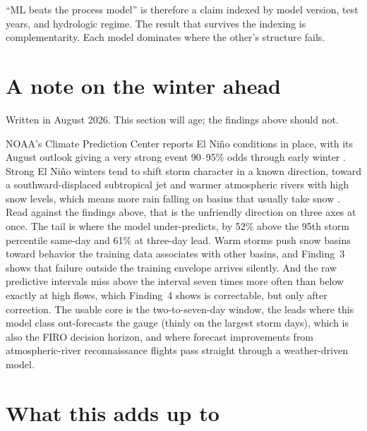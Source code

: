 \documentclass[11pt]{article}
\newcommand{\finding}[1]{\section*{#1}}
\begin{document}
``ML beats the process model'' is therefore a claim indexed by model version, test years,
and hydrologic regime. The result that survives the indexing is complementarity. Each
model dominates where the other's structure fails.

\finding{A note on the winter ahead}

Written in August 2026. This section will age; the findings above should not.

NOAA's Climate Prediction Center reports El Ni\~no conditions in place, with its August
outlook giving a very strong event 90--95\% odds through early winter
\citep{cpc2026enso}. Strong El Ni\~no winters tend to shift storm character in a known
direction, toward a southward-displaced subtropical jet and warmer atmospheric rivers with
high snow levels, which means more rain falling on basins that usually take snow
\citep{gershunov2025atmospheric}. Read against the findings above, that is the unfriendly
direction on three axes at once. The tail is where the model under-predicts, by 52\% above
the 95th storm percentile same-day and 61\% at three-day lead. Warm storms push snow
basins toward behavior the training data associates with other basins, and Finding~3 shows
that failure outside the training envelope arrives silently. And the raw predictive
intervals miss above the interval seven times more often than below exactly at high flows,
which Finding~4 shows is correctable, but only after correction. The usable core is the
two-to-seven-day window, the leads where this model class out-forecasts the gauge (thinly
on the largest storm days), which is also the FIRO decision horizon, and where forecast
improvements from atmospheric-river reconnaissance flights pass straight through a
weather-driven model.

\finding{What this adds up to}
\end{document}
